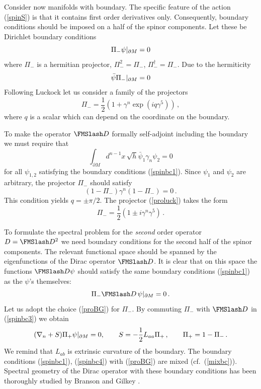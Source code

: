Consider now manifolds with boundary. The specific feature of the action
(\ref{spinS}) is that it contains first order derivatives
only. Consequently, boundary conditions should be imposed
on a half of the spinor components. Let these be Dirichlet
boundary conditions
\begin{equation}
\Pi_-\psi \vert_{\partial M} =0 \label{spinbc1}
\end{equation}
where $\Pi_-$ is a hermitian projector, $\Pi_-^2=\Pi_-$, 
$\Pi_-^\dag =\Pi_-$. Due to the hermiticity
\begin{equation}
\bar\psi\Pi_- \vert_{\partial M} =0 \label{spinbc2}
\end{equation}
Following Luckock \cite{Luckock:1990xr}
let us consider a family of the projectors
\begin{equation}
\Pi_-=\frac 12 \left( 1+\gamma^n \exp (iq\gamma^5) \right)\,,
\label{proluck}
\end{equation}
where $q$ is a scalar which can depend on the coordinate on
the boundary.

To make the operator
$\Dir$ formally self-adjoint including the boundary we must
require that 
\begin{equation}
\int_{\partial M} d^{n-1}x\,\sqrt{h} \bar\psi_1 \gamma_n \psi_2
=0 \label{symdir}
\end{equation}
for all $\psi_{1,2}$ satisfying the boundary conditions
(\ref{spinbc1}). Since $\psi_1$ and $\psi_2$ are arbitrary,
the projector $\Pi_-$ should satisfy
\begin{equation}
(1-\Pi_-)\gamma^n (1-\Pi_-)=0 \,.\label{cpr}
\end{equation}
This condition yields $q=\pm \pi /2$. The projector (\ref{proluck})
takes the form
\begin{equation}
\Pi_-=\frac 12 \left( 1\pm i\gamma^n \gamma^5 \right)\,.
\label{proBG}
\end{equation}

To formulate the spectral problem for the {\it second}
order operator $D=\Dir^2$ we need boundary conditions for
the second half of the spinor components. The relevant functional
space should be spanned by the eigenfunctions of the Dirac
operator $\Dir$. It is clear that on this space the functions
$\Dir\psi$ should satisfy the same boundary conditions
(\ref{spinbc1}) as the $\psi$'s themselves:
\begin{equation}
\Pi_-\Dir\,\psi \oB =0 \,.\label{spinbc3}
\end{equation}
Let us adopt the choice (\ref{proBG}) for $\Pi_-$.
By commuting $\Pi_-$ with $\Dir$ in (\ref{spinbc3}) we obtain
\begin{equation}
(\nabla_n +S)\Pi_+\psi \vert_{\partial M} =0,\qquad
S=-\frac 12 L_{aa}\Pi_+ \,,\qquad
\Pi_+=1-\Pi_- \,.\label{spinbc4}
\end{equation}
We remind that $L_{ab}$ is extrinsic curvature of the boundary.
The boundary conditions (\ref{spinbc1}), (\ref{spinbc4})
with (\ref{proBG}) are mixed (cf.\ (\ref{mixbc})).
Spectral geometry of the Dirac operator with these boundary conditions
has been thoroughly studied by Branson and Gilkey 
\cite{Branson:1992b}.

